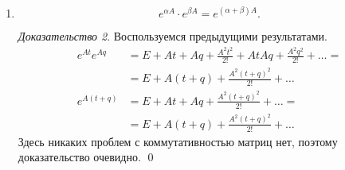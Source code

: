 \documentclass[a4paper,11pt]{article}
\theoremstyle{definition}
\theoremstyle{remark}
\newtheorem*{evidence}{Доказательство}
\begin{document}
\begin{enumerate}
\begin{evidence}
\begin{align*}
        &= E+A+B+\underbrace{\frac{A^2}{2!}+AB+\frac{B^2}{2!}}+\dots
      \end{align*}
      \begin{align*}
        e^{A+B} &= (E+A+B+\frac{(A+B)^2}{2!}+\dots) = \\
        &= (E+A+B+\underbrace{\frac{A^2}{2!}+\frac{AB+BA}{2!}+\frac{B^2}{2!}}+\dots) \qed
      \end{align*}
      Для того, чтобы $e^A\cdot e^B=e^{A+B}$, матрицы $A$ и $B$ должны коммутировать.
    \end{evidence}
    \item
      \begin{equation*}
        e^{\alpha A}\cdot e^{\beta A} = e^{(\alpha+\beta)A}.
      \end{equation*}
      \begin{evidence}
        Воспользуемся предыдущими результатами.
        \begin{align*}
          e^{At}e^{Aq} &= E+At+Aq+\frac{A^2t^2}{2!}+AtAq+\frac{A^2q^2}{2!}+\dots = \\
          &= E+A(t+q)+\frac{A^2(t+q)^2}{2!}+\dots \\
          e^{A(t+q)} &= E+At+Aq+\frac{A^2(t+q)^2}{2!}+\dots = \\
          &= E+A(t+q)+\frac{A^2(t+q)^2}{2!}+\dots
        \end{align*}
        Здесь никаких проблем с коммутативностью матриц нет, поэтому доказательство очевидно. \qed
      \end{evidence}
\end{enumerate}
\end{document}
